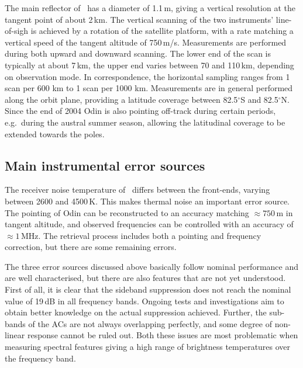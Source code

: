 The main reflector of \smr\ has a diameter of 1.1\,m, giving a
vertical resolution at the tangent point of about 2\,km. The vertical scanning
of the two instruments' line-of-sigh is achieved by a rotation of the satellite
platform, with a rate matching a vertical speed of the tangent altitude of
750\,m/s. Measurements are performed during both upward and downward scanning.
The lower end of the scan is typically at about 7\,km, the upper end varies
between 70 and 110\,km, depending on observation mode. In correspondence,
the horizontal sampling ranges from 1 scan per 600 km to 1 scan per 1000 km.
Measurements are in general performed along the orbit plane, providing a
latitude coverage between 82.5$^{\circ}$S and 82.5$^{\circ}$N. Since the end of
2004 Odin is also pointing off-track during certain periods, e.g.\ during the
austral summer season, allowing the latitudinal coverage to be extended towards
the poles. 


\subsection{Main instrumental error sources}
\label{sec:smr:errors}
%
The receiver noise temperature of \smr\ differs between the front-ends, varying
between 2600 and 4500\,K. This makes thermal noise an important error source.
The pointing of Odin can be reconstructed to an accuracy matching
$\approx750$\,m in tangent altitude, and observed frequencies
can be controlled with an accuracy of $\approx1$\,MHz. The retrieval process includes both a pointing
and frequency correction, but there are some remaining errors.

The three error sources discussed above basically follow nominal performance
and are well characterised, but there are also features that are not yet
understood. First of all, it is clear that the sideband suppression does not
reach the nominal value of 19\,dB in all frequency bands. Ongoing tests and
investigations aim to obtain better knowledge on the actual suppression achieved.
Further, the sub-bands of the ACs are not always overlapping perfectly, and
some degree of non-linear response cannot be ruled out. Both these issues are
most problematic when measuring spectral features giving a high range of
brightness temperatures over the frequency band.

